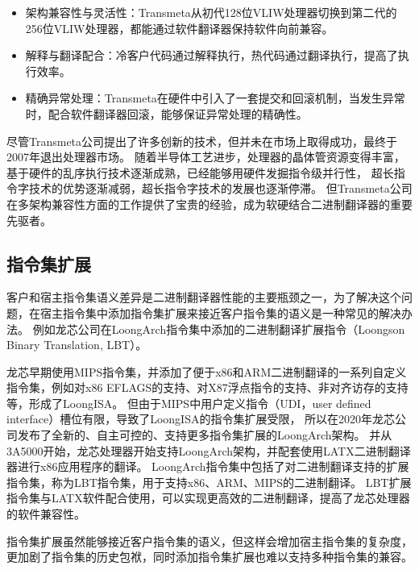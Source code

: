 \begin{itemize}
\item 架构兼容性与灵活性：Transmeta从初代128位VLIW处理器切换到第二代的256位VLIW处理器，都能通过软件翻译器保持软件向前兼容。
\item 解释与翻译配合：冷客户代码通过解释执行，热代码通过翻译执行，提高了执行效率。
\item 精确异常处理：Transmeta在硬件中引入了一套提交和回滚机制，当发生异常时，配合软件翻译器回滚，能够保证异常处理的精确性。
\end{itemize}

尽管Transmeta公司提出了许多创新的技术，但并未在市场上取得成功，最终于2007年退出处理器市场。
随着半导体工艺进步，处理器的晶体管资源变得丰富，基于硬件的乱序执行技术逐渐成熟，已经能够用硬件发掘指令级并行性，
超长指令字技术的优势逐渐减弱，超长指令字技术的发展也逐渐停滞。
但Transmeta公司在多架构兼容性方面的工作提供了宝贵的经验，成为软硬结合二进制翻译器的重要先驱者。

\subsection{指令集扩展}\label{sec:isa_extension}

客户和宿主指令集语义差异是二进制翻译器性能的主要瓶颈之一，为了解决这个问题，在宿主指令集中添加指令集扩展来接近客户指令集的语义是一种常见的解决办法。
例如龙芯公司在LoongArch指令集中添加的二进制翻译扩展指令（Loongson Binary Translation, LBT）\cite{LoongArch2023}。

龙芯早期使用MIPS指令集，并添加了便于x86和ARM二进制翻译的一系列自定义指令集，例如对x86 EFLAGS的支持、对X87浮点指令的支持、非对齐访存的支持等，形成了LoongISA\cite{LoongISA}。
但由于MIPS中用户定义指令（UDI，user defined interface）槽位有限，导致了LoongISA的指令集扩展受限，
所以在2020年龙芯公司发布了全新的、自主可控的、支持更多指令集扩展的LoongArch架构\cite{LoongArch2023}。
并从3A5000开始，龙芯处理器开始支持LoongArch架构，并配套使用LATX二进制翻译器进行x86应用程序的翻译。
LoongArch指令集中包括了对二进制翻译支持的扩展指令集，称为LBT指令集，用于支持x86、ARM、MIPS的二进制翻译。
LBT扩展指令集与LATX软件配合使用，可以实现更高效的二进制翻译，提高了龙芯处理器的软件兼容性。

指令集扩展虽然能够接近客户指令集的语义，但这样会增加宿主指令集的复杂度，更加剧了指令集的历史包袱，同时添加指令集扩展也难以支持多种指令集的兼容。



